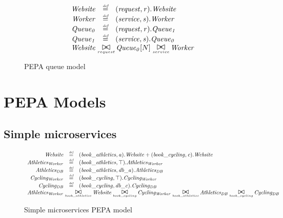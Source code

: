 \begin{figure}
\caption{PEPA queue model}
\centering
\begin{displaymath}
	\begin{array}{rcl}
\mathit{Website} & \rmdef & (\mathit{request},\mathit{r}).\mathit{Website}\\
		\mathit{Worker} & \rmdef & (\mathit{service},\mathit{s}).\mathit{Worker}\\
		\mathit{Queue_{0}} & \rmdef & (\mathit{request},\mathit{r}).\mathit{Queue_{1}}\\
		\mathit{Queue_{1}} & \rmdef & (\mathit{service},\mathit{s}).\mathit{Queue_{0}}\\
[0.0ex]		\multicolumn{3}{l}{\mathit{Website}\sync{request}\mathit{Queue_{0}}[N]\sync{service}\mathit{Worker}}\\
[0.0ex]	\end{array}
\end{displaymath}
\end{figure}

%
%

\section{PEPA Models}

%
%
\subsection{Simple microservices}

\begin{figure}
	\caption{Simple microservices PEPA model}
	\centering
\begin{displaymath}
	\begin{array}{rcl}
		\mathit{Website} & \rmdef & (\mathit{book\_athletics},\mathit{a}).\mathit{Website}+(\mathit{book\_cycling},\mathit{c}).\mathit{Website}\\
		\mathit{Athletics_{Worker}} & \rmdef & (\mathit{book\_athletics},\top).\mathit{Athletics_{Worker}}\\
		\mathit{Athletics_{DB}} & \rmdef & (\mathit{book\_athletics},\mathit{db\_a}).\mathit{Athletics_{DB}}\\
		\mathit{Cycling_{Worker}} & \rmdef & (\mathit{book\_cycling},\top).\mathit{Cycling_{Worker}}\\
		\mathit{Cycling_{DB}} & \rmdef & (\mathit{book\_cycling},\mathit{db\_c}).\mathit{Cycling_{DB}}\\
		[0.0ex]		\multicolumn{3}{l}{\mathit{Athletics_{Worker}}\sync{book\_athletics}\mathit{Website}\sync{book\_cycling}\mathit{Cycling_{Worker}}\sync{book\_athletics}\mathit{Athletics_{DB}}\sync{book\_cycling}\mathit{Cycling_{DB}}}\\
		[0.0ex]	\end{array}
\end{displaymath}
\end{figure}

